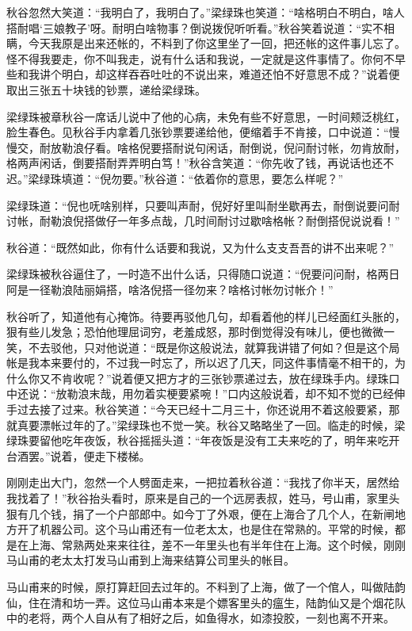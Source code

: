 \documentclass[12pt,UTF8]{ctexbook}
\begin{document}
{{{秋谷忽然大笑道：“我明白了，我明白了。”梁绿珠也笑道：“啥格明白不明白，啥人搭耐唱‘三娘教子’呀。耐明白啥物事？倒说拨倪听听看。”秋谷笑着说道：“实不相瞒，今天我原是出来还帐的，不料到了你这里坐了一回，把还帐的这件事儿忘了。怪不得我要走，你不叫我走，说有什么话和我说，一定就是这件事情了。你何不早些和我讲个明白，却这样吞吞吐吐的不说出来，难道还怕不好意思不成？”说着便取出三张五十块钱的钞票，递给梁绿珠。

梁绿珠被章秋谷一席话儿说中了他的心病，未免有些不好意思，一时间颊泛桃红，脸生春色。见秋谷手内拿着几张钞票要递给他，便缩着手不肯接，口中说道：“慢慢交，耐放勒浪仔看。啥格倪要搭耐说句闲话，耐倒说，倪问耐讨帐，勿肯放耐，格两声闲话，倒要搭耐弄弄明白笃！”秋谷含笑道：“你先收了钱，再说话也还不迟。”梁绿珠填道：“倪勿要。”秋谷道：“依着你的意思，要怎么样呢？”

梁绿珠道：“倪也呒啥别样，只要叫声耐，倪好好里叫耐坐歇再去，耐倒说要问耐讨帐，耐勒浪倪搭做仔一年多点哉，几时间耐讨过歇啥格帐？耐倒搭倪说说看！”

秋谷道：“既然如此，你有什么话要和我说，又为什么支支吾吾的讲不出来呢？”

梁绿珠被秋谷逼住了，一时造不出什么话，只得随口说道：“倪要问问耐，格两日阿是一径勒浪陆丽娟搭，啥洛倪搭一径勿来？啥格讨帐勿讨帐介！”

秋谷听了，知道他有心掩饰。待要再驳他几句，却看着他的样儿已经面红头胀的，狠有些儿发急；恐怕他理屈词穷，老羞成怒，那时倒觉得没有味儿，便也微微一笑，不去驳他，只对他说道：“既是你这般说法，就算我讲错了何如？但是这个局帐是我本来要付的，不过我一时忘了，所以迟了几天，同这件事情毫不相干的，为什么你又不肯收呢？”说着便又把方才的三张钞票递过去，放在绿珠手内。绿珠口中还说：“放勒浪末哉，用勿着实梗要紧啘！”口内这般说着，却不知不觉的已经伸手过去接了过来。秋谷笑道：“今天已经十二月三十，你还说用不着这般要紧，那就真要漂帐过年的了。”梁绿珠也不觉一笑。秋谷又略略坐了一回。临走的时候，梁绿珠要留他吃年夜饭，秋谷摇摇头道：“年夜饭是没有工夫来吃的了，明年来吃开台酒罢。”说着，便走下楼梯。

刚刚走出大门，忽然一个人劈面走来，一把拉着秋谷道：“我找了你半天，居然给我找着了！”秋谷抬头看时，原来是自己的一个远房表叔，姓马，号山甫，家里头狠有几个钱，捐了一个户部郎中。如今丁了外艰，便在上海合了几个人，在新闸地方开了机器公司。这个马山甫还有一位老太太，也是住在常熟的。平常的时候，都是在上海、常熟两处来来往往，差不一年里头也有半年住在上海。这个时候，刚刚马山甫的老太太打发马山甫到上海来结算公司里头的帐目。

马山甫来的时候，原打算赶回去过年的。不料到了上海，做了一个倌人，叫做陆韵仙，住在清和坊一弄。这位马山甫本来是个嫖客里头的瘟生，陆韵仙又是个烟花队中的老将，两个人自从有了相好之后，如鱼得水，如漆投胶，一刻也离不开来。

}}}
\end{document}
